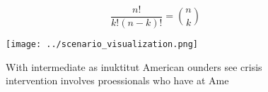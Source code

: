 \documentclass[a4paper]{article}
\begin{document}
\[ \frac{n!}{k!(n-k)!} = \binom{n}{k} \]

\begin{figure}
\centering
\texttt{[image: ../scenario\_visualization.png]}
\caption{With intermediate as inuktitut American ounders see crisis intervention involves proessionals who have at Ame
}
\end{figure}
 
\end{document}
